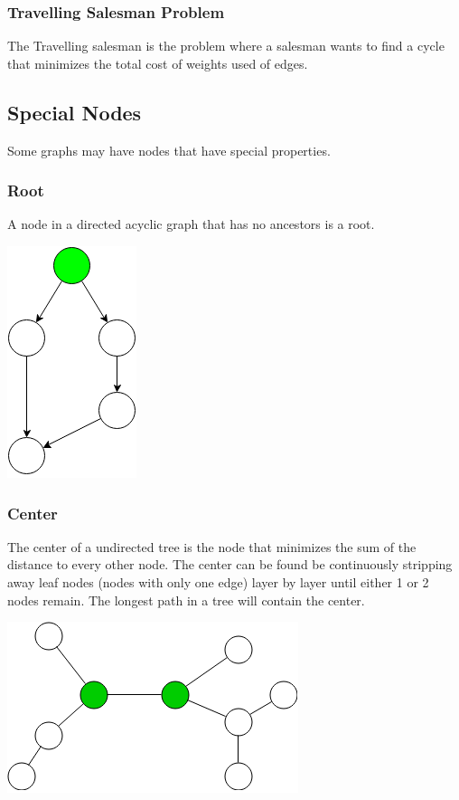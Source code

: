 \documentclass[11pt,oneside]{book}
\makeatletter
\def\maxwidth#1{\ifdim\Gin@nat@width>#1 #1\else\Gin@nat@width\fi}
\makeatother
\begin{document}
\subsubsection{Travelling Salesman Problem}

The Travelling salesman is the problem where a salesman wants to find a cycle that minimizes the total cost of weights used of edges.

\subsection{Special Nodes}

Some graphs may have nodes that have special properties.

\subsubsection{Root}

A node in a directed acyclic graph that has no ancestors is a root.

\includegraphics[width=\maxwidth{\textwidth}]{treeroot.png}

\subsubsection{Center}

The center of a undirected tree is the node that minimizes the sum of the distance to every other node.  The center can be found be continuously stripping away leaf nodes (nodes with only one edge) layer by layer until either 1 or 2 nodes remain. The longest path in a tree will contain the center.

\includegraphics[width=\maxwidth{\textwidth}]{centergraph.png}
\end{document}
